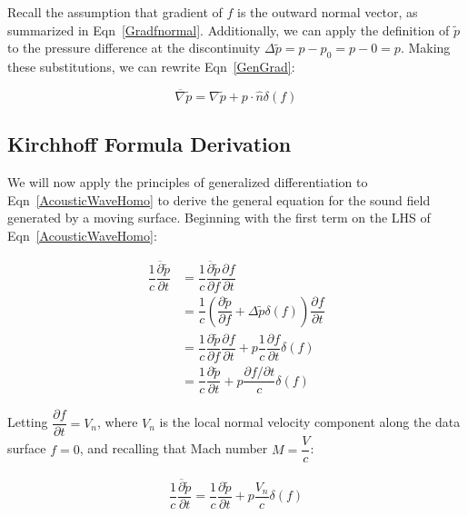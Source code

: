 \documentclass[]{aiaa-tc}%
\begin{document}
Recall the assumption that gradient of $f$ is the outward normal vector, as summarized in Eqn~\ref{Gradfnormal}.  Additionally, we can apply the definition of $\widetilde{p}$ to the pressure difference at the discontinuity $\Delta\widetilde{p} = p - p_0 = p - 0 = p$.  Making these substitutions, we can rewrite Eqn~\ref{GenGrad}:

\begin{equation} \label{GenGradAssume}
\overline{\nabla} \widetilde{p}
= \nabla\widetilde{p} + p \cdot \hat{n} \delta(f)
\end{equation}


\subsection{Kirchhoff Formula Derivation}

We will now apply the principles of generalized differentiation to Eqn~\ref{AcousticWaveHomo} to derive the general equation for the sound field generated by a moving surface.  Beginning with the first term on the LHS of Eqn~\ref{AcousticWaveHomo}:

\begin{align*}
\dfrac{1}{c}\dfrac{\overline{\partial}\widetilde{p}}{\partial t}
&= \dfrac{1}{c}\dfrac{\overline{\partial}\widetilde{p}}{\partial f}
    \dfrac{\partial f}{\partial t} \\
&= \dfrac{1}{c}\left( \dfrac{\partial\widetilde{p}}{\partial f}
    + \Delta \widetilde{p} \delta(f) \right)
    \dfrac{\partial f}{\partial t} \\
&= \dfrac{1}{c}\dfrac{\partial\widetilde{p}}{\partial f} \dfrac{\partial f}{\partial t}
    + p \dfrac{1}{c}\dfrac{\partial f}{\partial t} \delta(f) \\
&= \dfrac{1}{c}\dfrac{\partial\widetilde{p}}{\partial t}
    + p \dfrac{\partial f / \partial t}{c} \delta(f)
\end{align*}

\noindent Letting $\dfrac{\partial f}{\partial t} = V_n$, where $V_n$ is the local normal velocity component along the data surface $f=0$, and recalling that Mach number $M = \dfrac{V}{c}$:

\begin{align*}
\dfrac{1}{c}\dfrac{\overline{\partial}\widetilde{p}}{\partial t}
= \dfrac{1}{c}\dfrac{\partial\widetilde{p}}{\partial t}
    + p \dfrac{V_n}{c} \delta(f)
\end{align*}
\end{document}
